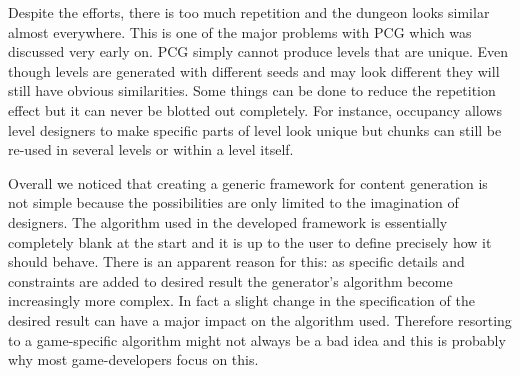 Despite the efforts, there is too much repetition and the dungeon looks similar almost everywhere. This is one of the major problems with PCG which was discussed very early on. PCG simply cannot produce levels that are unique. Even though levels are generated with different seeds and may look different they will still have obvious similarities. Some things can be done to reduce the repetition effect but it can never be blotted out completely. For instance, occupancy allows level designers to make specific parts of level look unique but chunks can still be re-used in several levels or within a level itself.

Overall we noticed that creating a generic framework for content generation is not simple because the possibilities are only limited to the imagination of designers. The algorithm used in the developed framework is essentially completely blank at the start and it is up to the user to define precisely how it should behave. There is an apparent reason for this: as specific details and constraints are added to desired result the generator's algorithm become increasingly more complex. In fact a slight change in the specification of the desired result can have a major impact on the algorithm used. Therefore resorting to a game-specific algorithm  might not always be a bad idea and this is probably why most game-developers focus on this.